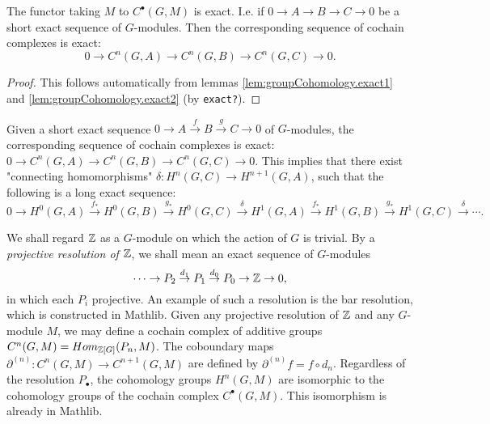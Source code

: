 \begin{lemma}
  \label{lem:cochainsFunctor exact}
  The functor taking $M$ to $C^\bullet (G,M)$ is exact.
  I.e. if $0 \to A \to B \to C \to 0$ be a short exact sequence of $G$-modules.
  Then the corresponding sequence of cochain complexes is exact:
  \[
    0 \to C^n(G,A) \to C^n(G,B) \to C^n(G,C) \to 0.
  \]
\end{lemma}

\begin{proof}
  This follows automatically from lemmas \ref{lem:groupCohomology.exact1}
  and \ref{lem:groupCohomology.exact2} (by \texttt{exact?}).
\end{proof}

\begin{definition}
  \label{def: Long exact sequences}
  Given a short exact sequence $0 \to A \stackrel{f}\to B \stackrel{g}\to C \to 0$ of $G$-modules,
  the corresponding sequence of cochain complexes is exact:
  $0 \to C^n(G,A) \to C^n(G,B) \to C^n(G,C) \to 0$.
  This implies that there exist "connecting homomorphisms" $\delta : H^n(G,C) \to H^{n+1}(G,A)$,
  such that the following is a long exact sequence:
  \[
    0 \to H^0(G,A) \stackrel{f_*}\to H^0(G,B) \stackrel{g_*}\to H^0(G,C) \stackrel{\delta}\to
    H^1(G,A) \stackrel{f_*}\to H^1(G,B) \stackrel{g_*} \to H^1(G,C) \stackrel{\delta}\to \cdots.
  \]
\end{definition}






We shall regard ${\mathbb Z}$ as a $G$-module on which the action of $G$ is trivial.
By a \emph{projective resolution of ${\mathbb Z}$}, we shall mean an exact sequence of $G$-modules
\[
  \cdots \to P_2 \stackrel{d_1}\to P_1 \stackrel{d_0}\to P_0 \to {\mathbb Z} \to 0,
\]
in which each $P_i$ projective.
An example of such a resolution is the bar resolution,
which is constructed in Mathlib.
Given any projective resolution of ${\mathbb Z}$ and any $G$-module $M$, we may define a cochain
complex of additive groups $C^n(G,M) = Hom_{{\mathbb Z}[G]}(P_n,M)$. The coboundary maps
$\partial^{(n)} : C^n(G,M) \to C^{n+1}(G,M)$ are defined by $\partial^{(n)} f = f \circ d_n$.
Regardless of the resolution $P_\bullet$,
the cohomology groups $H^n(G,M)$ are isomorphic to the cohomology groups
of the cochain complex $C^\bullet(G,M)$. This isomorphism is already in Mathlib.

